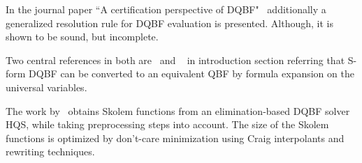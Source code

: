 \documentclass{article}
\begin{document}
In the journal paper ``A certification perspective of DQBF"~\cite{balabanov2014henkin} additionally a generalized resolution rule for DQBF evaluation is presented. Although,  it is shown to be sound, but incomplete.
	
Two central references in both are~\cite{bubeck2006dependency} and ~\cite{bubeck2010model} in introduction section referring that S-form DQBF can be converted to an equivalent QBF by formula expansion on the universal variables.
	

The work by~\cite{wimmer2016skolem} obtains Skolem functions from an elimination-based DQBF solver HQS, while taking preprocessing steps into account.
%
The size of the Skolem functions is optimized by don’t-care minimization using Craig interpolants and rewriting techniques.

%


\end{document}
